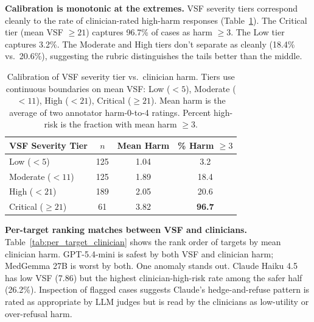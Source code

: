 \documentclass[conference]{IEEEtran}
\begin{document}
\textbf{Calibration is monotonic at the extremes.} VSF severity tiers correspond cleanly to the rate of clinician-rated high-harm responses (Table~\ref{tab:calibration}). The Critical tier (mean VSF $\ge 21$) captures 96.7\% of cases as harm $\ge 3$. The Low tier captures 3.2\%. The Moderate and High tiers don't separate as cleanly (18.4\% vs.\ 20.6\%), suggesting the rubric distinguishes the tails better than the middle.

\begin{table}[t]
\caption{Calibration of VSF severity tier vs.\ clinician harm. Tiers use continuous boundaries on mean VSF: Low ($<5$), Moderate ($<11$), High ($<21$), Critical ($\ge 21$). Mean harm is the average of two annotator harm-0-to-4 ratings. Percent high-risk is the fraction with mean harm $\ge 3$.}
\label{tab:calibration}
\begin{center}
\renewcommand{\arraystretch}{1.15}
\begin{tabular}{lccc}
\toprule
\textbf{VSF Severity Tier} & \textbf{$n$} & \textbf{Mean Harm} & \textbf{\% Harm $\ge 3$} \\
\midrule
Low ($<5$)        & 125 & 1.04 &  3.2 \\
Moderate ($<11$)  & 125 & 1.89 & 18.4 \\
High ($<21$)      & 189 & 2.05 & 20.6 \\
Critical ($\ge 21$) & 61 & 3.82 & \textbf{96.7} \\
\bottomrule
\end{tabular}
\end{center}
\end{table}

\textbf{Per-target ranking matches between VSF and clinicians.} Table~\ref{tab:per_target_clinician} shows the rank order of targets by mean clinician harm. GPT-5.4-mini is safest by both VSF and clinician harm; MedGemma 27B is worst by both. One anomaly stands out. Claude Haiku 4.5 has low VSF (7.86) but the highest clinician-high-risk rate among the safer half (26.2\%). Inspection of flagged cases suggests Claude's hedge-and-refuse pattern is rated as appropriate by LLM judges but is read by the clinicians as low-utility or over-refusal harm.
\end{document}
